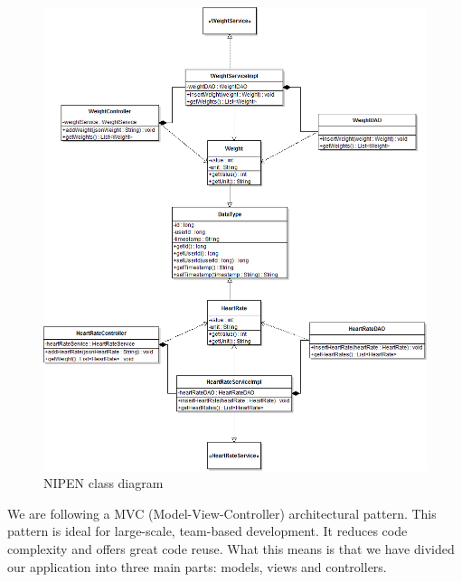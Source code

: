 \begin{figure}[h]
\centering
\includegraphics[scale=0.5]{../Figures/NIPEN-class-diagram.png}
\caption{NIPEN class diagram}
\label{figure:nipen-class-diagram}
\end{figure}

We are following a MVC (Model-View-Controller) architectural pattern. 
This pattern is ideal for large-scale, team-based development.
It reduces code complexity and offers great code reuse. 
What this means is that we have divided our application into three main parts: models, views and controllers.

